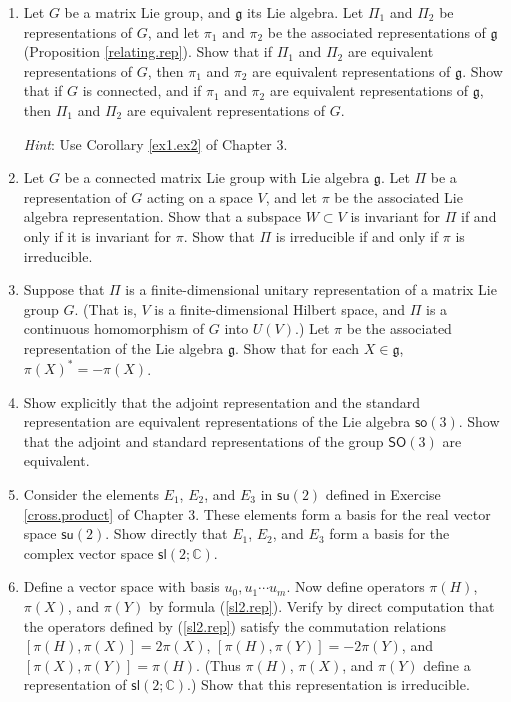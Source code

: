 \documentclass{amsbook}
\let \frak = \mathfrak
\theoremstyle{plain}
\numberwithin{equation}{chapter}
\numberwithin{theorem}{chapter}
\begin{document}
\begin{enumerate}
\item  Let $G$ be a matrix Lie group, and $\frak{g}$ its Lie algebra. Let
$\Pi_{1}$ and $\Pi_{2}$ be representations of $G$, and let $\pi_{1}$ and
$\pi_{2}$ be the associated representations of $\frak{g}$ (Proposition
\ref{relating.rep}). Show that if $\Pi_{1}$ and $\Pi_{2}$ are equivalent
representations of $G$, then $\pi_{1}$ and $\pi_{2}$ are equivalent
representations of $\frak{g}$. Show that if $G$ is connected, and if $\pi_{1}$
and $\pi_{2}$ are equivalent representations of $\frak{g}$, then $\Pi_{1}$ and
$\Pi_{2}$ are equivalent representations of $G$.

\textit{Hint}: Use Corollary \ref{ex1.ex2} of Chapter 3.

\item  Let $G$ be a connected matrix Lie group with Lie algebra $\frak{g}$.
Let $\Pi$ be a representation of $G$ acting on a space $V$, and let $\pi$ be
the associated Lie algebra representation. Show that a subspace $W\subset V$
is invariant for $\Pi$ if and only if it is invariant for $\pi$. Show that
$\Pi$ is irreducible if and only if $\pi$ is irreducible.

\item  Suppose that $\Pi$ is a finite-dimensional unitary representation of a
matrix Lie group $G$. (That is, $V$ is a finite-dimensional Hilbert space, and
$\Pi$ is a continuous homomorphism of $G$ into $U(V)$.) Let $\pi$ be the
associated representation of the Lie algebra $\frak{g}$. Show that for each
$X\in\frak{g}$, $\pi(X)^{\ast}=-\pi(X)$.

\item \label{equiv.rep}Show explicitly that the adjoint representation and the
standard representation are equivalent representations of the Lie algebra
$\mathsf{so}(3)$. Show that the adjoint and standard representations of the
group $\mathsf{SO}(3)$ are equivalent.

\item \label{su2.sl2}Consider the elements $E_{1}$, $E_{2}$, and $E_{3}$ in
$\mathsf{su}(2)$ defined in Exercise \ref{cross.product} of Chapter 3. These
elements form a basis for the real vector space $\mathsf{su}(2)$. Show
directly that $E_{1}$, $E_{2}$, and $E_{3}$ form a basis for the complex
vector space $\mathsf{sl}(2;\mathbb{C})$.

\item \label{sl2.check}Define a vector space with basis $u_{0},u_{1}\cdots
u_{m}$. Now define operators $\pi(H)$, $\pi(X)$, and $\pi(Y)$ by formula
(\ref{sl2.rep}). Verify by direct computation that the operators defined by
(\ref{sl2.rep}) satisfy the commutation relations $\left[  \pi(H),\pi
(X)\right]  =2\pi(X)$, $\left[  \pi(H),\pi(Y)\right]  =-2\pi(Y)$, and $\left[
\pi(X),\pi(Y)\right]  =\pi(H)$. (Thus $\pi(H)$, $\pi(X)$, and $\pi(Y)$ define
a representation of $\mathsf{sl}(2;\mathbb{C})$.) Show that this
representation is irreducible.


\end{enumerate}
\end{document}
